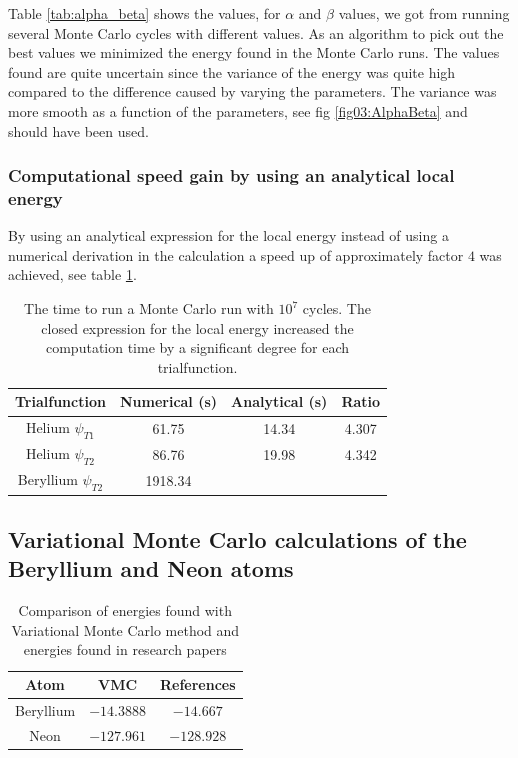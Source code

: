 \documentclass[11pt]{article}
\begin{document}
			Table \ref{tab:alpha_beta} shows the values, for \(\alpha\) and \(\beta\) values, we got from  running several Monte Carlo cycles with different values. As an algorithm to pick out the best values we minimized the energy found in the Monte Carlo runs. The values found are quite uncertain since the variance of the energy was quite high compared to the difference caused by varying the parameters. The variance was more smooth as a function of the parameters, see fig \ref{fig03:AlphaBeta} and should have been used.


			\subsubsection{Computational speed gain by using an analytical local energy}
				By using an analytical expression for the local energy instead of using a numerical derivation in the calculation a speed up of approximately factor \(4\) was achieved, see table \ref{tab:analyticVSNumeric}.


				\begin{table}
					\center
					\begin{tabular}{| c | c | c | c |}
					    \hline
					   	\textbf{Trialfunction} & Numerical (s) & Analytical (s) & Ratio
					    \\ \hline
					    Helium $\psi_{T1}$ & 61.75 & 14.34 & 4.307
					    \\ \hline
					    Helium $\psi_{T2}$ & 86.76 & 19.98	& 4.342
					    \\	\hline
					    Beryllium $\psi_{T2}$ & 1918.34  &	 &
	 				    \\ \hline
					\end{tabular}
					\caption{The time to run a Monte Carlo run with \(10^7\) cycles. The closed expression for the local energy increased the computation time by a significant degree for each trialfunction. }
					\label{tab:analyticVSNumeric}
				\end{table}

	\subsection{Variational Monte Carlo calculations of the Beryllium and Neon atoms}

		\begin{table}
			\center
				\begin{tabular}{|c|c|c|}
				    \hline
				   	Atom & VMC & References
				    \\ \hline
				    Beryllium & $-14.3888$ & $-14.667$
				    \\ \hline
				    Neon & $-127.961$ &  \(-128.928\)
				    \\	\hline
			  \end{tabular}
			  \caption{Comparison of energies found with Variational Monte Carlo method and
			energies found in research papers \cite{Koput:2011:PCCP} \cite{QUA:QUA560090204} }
			\label{tab:energyReference}
		\end{table}
\end{document}
